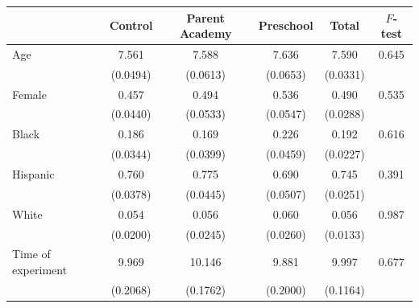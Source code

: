 \begin{tabular}{lccccc}
\toprule
 & Control & Parent Academy & Preschool & Total & $F$-test \\
\midrule
Age & 7.561 & 7.588 & 7.636 & 7.590 & 0.645 \\
 & (0.0494) & (0.0613) & (0.0653) & (0.0331) & \\
Female & 0.457 & 0.494 & 0.536 & 0.490 & 0.535 \\
 & (0.0440) & (0.0533) & (0.0547) & (0.0288) & \\
Black & 0.186 & 0.169 & 0.226 & 0.192 & 0.616 \\
 & (0.0344) & (0.0399) & (0.0459) & (0.0227) & \\
Hispanic & 0.760 & 0.775 & 0.690 & 0.745 & 0.391 \\
 & (0.0378) & (0.0445) & (0.0507) & (0.0251) & \\
White & 0.054 & 0.056 & 0.060 & 0.056 & 0.987 \\
 & (0.0200) & (0.0245) & (0.0260) & (0.0133) & \\
Time of experiment & 9.969 & 10.146 & 9.881 & 9.997 & 0.677 \\
 & (0.2068) & (0.1762) & (0.2000) & (0.1164) & \\
\bottomrule
\end{tabular}
